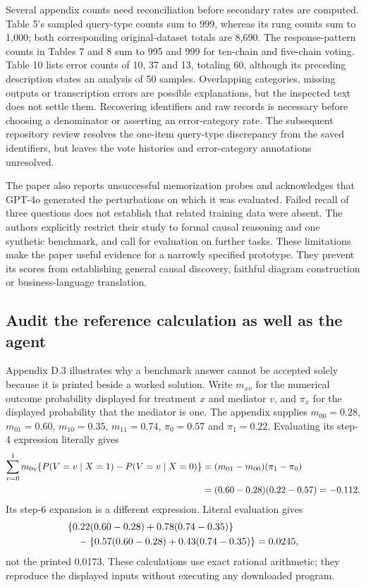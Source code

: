 Several appendix counts need reconciliation before secondary rates are computed.
Table 5's sampled query-type counts sum to 999, whereas its rung counts sum to
1,000; both corresponding original-dataset totals are 8,690. The response-pattern
counts in Tables 7 and 8 sum to 995 and 999 for ten-chain and five-chain voting.
Table 10 lists error counts of 10, 37 and 13, totaling 60, although its preceding
description states an analysis of 50 samples. Overlapping categories, missing
outputs or transcription errors are possible explanations, but the inspected
text does not settle them. Recovering identifiers and raw records is necessary
before choosing a denominator or asserting an error-category rate. The subsequent repository review resolves the one-item query-type discrepancy from the saved identifiers, but leaves the vote histories and error-category annotations unresolved.
\citep{exec21_prophets,exec21_prophets_reference}

The paper also reports unsuccessful memorization probes and acknowledges that
GPT-4o generated the perturbations on which it was evaluated. Failed recall of
three questions does not establish that related training data were absent.
The authors explicitly restrict their study to formal causal reasoning and one
synthetic benchmark, and call for evaluation on further tasks. These limitations
make the paper useful evidence for a narrowly specified prototype. They prevent
its scores from establishing general causal discovery, faithful diagram
construction or business-language translation.~\citep{exec21_prophets}

\subsection{Audit the reference calculation as well as the agent}
\label{exec21:prophets-arithmetic}
Appendix D.3 illustrates why a benchmark answer cannot be accepted solely because
it is printed beside a worked solution. Write $m_{xv}$ for the numerical outcome
probability displayed for treatment $x$ and mediator $v$, and $\pi_x$ for the
displayed probability that the mediator is one. The appendix supplies
$m_{00}=0.28$, $m_{01}=0.60$, $m_{10}=0.35$, $m_{11}=0.74$,
$\pi_0=0.57$ and $\pi_1=0.22$. Evaluating its step-4 expression literally gives
\begin{align}
 \sum_{v=0}^1 m_{0v}
 \{P(V=v\mid X=1)-P(V=v\mid X=0)\}
 &=(m_{01}-m_{00})(\pi_1-\pi_0)\notag\\
 &=(0.60-0.28)(0.22-0.57)=-0.112.
 \label{exec21:prophets-literal}
\end{align}
Its step-6 expansion is a different expression. Literal evaluation gives
\begin{align}
 &\{0.22(0.60-0.28)+0.78(0.74-0.35)\}\notag\\
 &\quad-\{0.57(0.60-0.28)+0.43(0.74-0.35)\}
 =0.0245,
 \label{exec21:prophets-expanded}
\end{align}
not the printed 0.0173. These calculations use exact rational arithmetic;
they reproduce the displayed inputs without executing any downloaded program.
\citep{exec21_prophets,exec21_prophets_reference}

